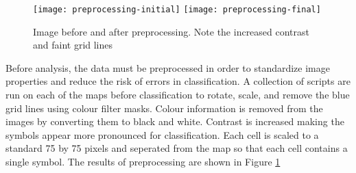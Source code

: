 \begin{figure}[h]
    \begin{center}
    \texttt{[image: preprocessing-initial]}
    \texttt{[image: preprocessing-final]}
    \label{figure:preprocess}
    \caption{Image before and after preprocessing. Note the increased contrast and faint grid lines}
    \end{center}
\end{figure}

Before analysis, the data must be preprocessed in order to standardize image
properties and reduce the risk of errors in classification. A collection of
scripts are run on each of the maps before classification to rotate, scale,
and remove the blue grid lines using colour filter masks.  Colour information is
removed from the images by converting them to black and white. Contrast is increased making the symbols appear more pronounced for classification. Each cell is scaled to a standard 75 by 75 pixels and seperated from the map so that each cell contains a single symbol.  The results of preprocessing are shown in Figure \ref{figure:preprocess}

